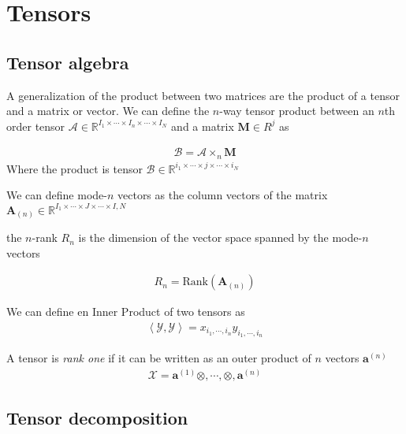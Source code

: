 \chapter{Tensors}

\section{Tensor algebra}

A generalization of the product between two matrices are the product of a tensor and a matrix or vector. We can define the $n$-way tensor product between an $n$th order tensor $\mathcal{A}\in\mathbb{R}^{I_1\times\cdots\times I_n\times\cdots\times I_N}$ and a matrix $\mathbf{M}\in R^{j} $ as\cite{tensorface}

\begin{align}
\mathcal{B} = \mathcal{A}\times_n\mathbf{M}
\end{align}
Where the product is  tensor $\mathcal{B} \in \mathbb{R}^{i_1\times\cdots\times j \times\cdots\times i_N}$

We can define mode-$n$ vectors as the column vectors of the matrix
$\mathbf{A}_{(n)}\in\mathbb{R}^{I_1\times\cdots\times J \times\cdots\times I,N} $ \cite{tensorface}

the $n$-rank $R_n$ is the dimension of the vector space spanned by the mode-$n$ vectors

\begin{align}
  R_n = \text{Rank}(\mathbf{A}_{(n)})
\end{align}


We can define en Inner Product of two tensors as
\begin{align}
  \left<\mathcal{Y},\mathcal{Y}\right> = x_{i_1,\cdots,i_n} y_{i_1,\cdots,i_n}
\end{align}

A tensor is \emph{rank one} if it can be written as an outer product of $n$ vectors $\mathbf{a}^(n)$
\begin{align}
  \mathcal{X} = \mathbf{a}^(1)\otimes,\cdots,\otimes,\mathbf{a}^(n)
\end{align}



\section{Tensor decomposition}


